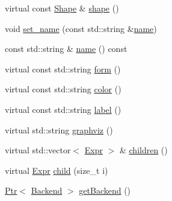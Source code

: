 \begin{DoxyCompactItemize}
\item 
virtual const \hyperlink{structmarian_1_1Shape}{Shape} \& \hyperlink{classmarian_1_1Node_aa631f0244ad94b4c64efab0f140bd1d5}{shape} ()
\item 
void \hyperlink{classmarian_1_1Node_a49ccf279e3d19a3d49efca7444c66543}{set\+\_\+name} (const std\+::string \&\hyperlink{classmarian_1_1Node_ad5437ac41eaa8316791698db9ad46ab0}{name})
\item 
const std\+::string \& \hyperlink{classmarian_1_1Node_ad5437ac41eaa8316791698db9ad46ab0}{name} () const 
\item 
virtual const std\+::string \hyperlink{classmarian_1_1Node_a7aaaab594766b33355f2b31821b8af49}{form} ()
\item 
virtual const std\+::string \hyperlink{classmarian_1_1Node_a19cfc4e99a01cb4a3fe1b20dce3b7db2}{color} ()
\item 
virtual const std\+::string \hyperlink{classmarian_1_1Node_aa29cd2fb7c4e0b81387e70b318b8f001}{label} ()
\item 
virtual std\+::string \hyperlink{classmarian_1_1Node_af2a1cdef73f50b9dd16d3c363cc12222}{graphviz} ()
\item 
virtual std\+::vector$<$ \hyperlink{namespacemarian_a498d8baf75b754011078b890b39c8e12}{Expr} $>$ \& \hyperlink{classmarian_1_1Node_a72e48d89624de0ea4ee98c39e60b3ecb}{children} ()
\item 
virtual \hyperlink{namespacemarian_a498d8baf75b754011078b890b39c8e12}{Expr} \hyperlink{classmarian_1_1Node_a71a9c8ad6ba12d421fa97222d74a90b9}{child} (size\+\_\+t i)
\item 
\hyperlink{namespacemarian_ad1a373be43a00ef9ce35666145137b08}{Ptr}$<$ \hyperlink{classmarian_1_1Backend}{Backend} $>$ \hyperlink{classmarian_1_1Node_a4aa5aa482c70595fa5d43c1fbabf5c18}{get\+Backend} ()
\end{DoxyCompactItemize}
